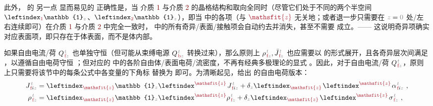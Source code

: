 此外， 的 另一点 显而易见的 正确性是，当 介质 \textcolor{Maroon}{1} 与介质 \textcolor{Maroon}{2} 的晶格结构和取向全同时（尽管它们处于不同的两个半空间 $\leftindex_{\textcolor{Maroon}{1}} {\mathbb{1}}_{\mathcolor{gray}{z}}$、$\leftindex_{\textcolor{Maroon}{2}} {\mathbb{1}}_{\mathcolor{gray}{z}}$），即当  中的各项（与 $\textcolor{Maroon}{\mathsfit{z}}$ 无关地；或者退一步只需要在 $\mathcolor{gray}{z \mathcolor{black}{=} 0}$ 处/左右连续即可）在介质 \textcolor{Maroon}{1} 与介质 \textcolor{Maroon}{2} 中完全一致时， 中的所有奇异/表面/接触项会自动约去并消失，甚至不需要  成立。—— 这说明奇异项确实对应表面项，即只存在于体表面，而不是体内部。

如果自由电流/荷 ${Q}^{\;\!\mathcolor{gray}{t}}_{\;\!\textcolor{Maroon}{\text{f}}\mathcolor{gray}{z}}$ 也单独守恒（但可能从束缚电源 ${Q}^{\;\!\mathcolor{gray}{t}}_{\;\!\textcolor{Maroon}{\text{b}}\mathcolor{gray}{z}}$ 转换过来），那么原则上 ${\rho}^{\;\!\mathcolor{gray}{t}}_{\;\!\textcolor{Maroon}{\text{f}}\mathcolor{gray}{z}},\bar{J}^{\;\!\mathcolor{gray}{t}}_{\;\!\textcolor{Maroon}{\text{f}}\mathcolor{gray}{z}}$ 也应需要以  的形式展开，且各奇异层次间满足 ，以遵循自由电荷守恒 ；但对应的  中的各阶自由体/表面电荷/流密度，不再有经典多极理论的显式 。因此，对于自由电流/荷 ${Q}^{\;\!\mathcolor{gray}{t}}_{\;\!\textcolor{Maroon}{\text{f}}\mathcolor{gray}{z}}$，原则上只需要将该节中的每条公式中各变量的下角标 \textcolor{Maroon}{} 替换为 \textcolor{Maroon}{} 即可。为清晰起见，给出  的自由电荷版本：
\begin{subequations} \label{eq:e-f-01}
\begin{align}
	J^{\;\!\mathcolor{gray}{t}}_{\;\!\textcolor{Maroon}{\text{f}} i\mathcolor{gray}{z}} &= \leftindex_{\textcolor{Maroon}{\mathsfit{z}}} {\mathbb{1}}_{\mathcolor{gray}{z}} \leftindex^{\textcolor{Maroon}{\mathsfit{z}}} \;\! J^{\;\!\mathcolor{gray}{t}}_{\;\!\textcolor{Maroon}{\text{f}} i\mathcolor{gray}{z}} + \delta_{\mathcolor{gray}{z}} \leftindex_{\textcolor{Maroon}{\mathsfit{z}}} \;\! \leftindex^{\textcolor{Maroon}{\mathsfit{z}}} \;\!
	{\alpha}^{\;\!\mathcolor{gray}{t}}_{\;\!\textcolor{Maroon}{\text{f}} i\mathcolor{gray}{z}} ~, \label{eq:j-f-01} \\
	{\rho}^{\;\!\mathcolor{gray}{t}}_{\;\!\textcolor{Maroon}{\text{f}}\mathcolor{gray}{z}} &= \leftindex_{\textcolor{Maroon}{\mathsfit{z}}} {\mathbb{1}}_{\mathcolor{gray}{z}} \leftindex^{\textcolor{Maroon}{\mathsfit{z}}} {\rho}^{\;\!\mathcolor{gray}{t}}_{\;\!\textcolor{Maroon}{\text{f}}\mathcolor{gray}{z}} + \delta_{\mathcolor{gray}{z}} \leftindex_{\textcolor{Maroon}{\mathsfit{z}}} \;\! \leftindex^{\textcolor{Maroon}{\mathsfit{z}}} \;\! {\sigma}^{\;\!\mathcolor{gray}{t}}_{\;\!\textcolor{Maroon}{\text{f}} \mathcolor{gray}{z}} ~, \label{eq:p-f-01}
\end{align}
\end{subequations}
